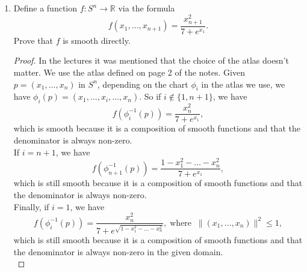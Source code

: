 \documentclass{article}
\begin{document}
\begin{enumerate}[label={\bf Q\arabic*:}]
  \item Define a function $f:S^n\rightarrow\mathbb{R}$ via the formula
    \begin{equation*}
      f(x_1,\ldots,x_{n+1}) = \frac{x_{n+1}^2}{7+e^{x_1}}.
    \end{equation*}
    Prove that $f$ is smooth directly.

    \begin{proof}
      In the lectures it was mentioned that the choice of the atlas doesn't
      matter. We use the atlas defined on page 2 of the notes. Given
      $p=(x_1,\ldots,x_n)$ in $S^n$, depending on the chart $\phi_i$ in the
      atlas we use, we have $\phi_i(p)=(x_1,\ldots,\hat{x_i},\ldots,x_n)$.
      So if $i\not\in\{1,n+1\}$, we have
      \begin{equation*}
        f(\phi_i^{-1}(p)) = \frac{x_{n}^2}{7+e^{x_1}},
      \end{equation*}
      which is smooth because it is a composition of smooth functions and
      that the denominator is always non-zero. \\

      If $i=n+1$, we have
      \begin{equation*}
        f(\phi_{n+1}^{-1}(p)) = \frac{1-x_1^2-\ldots-x_n^2}{7+e^{x_1}},
      \end{equation*}
      which is still smooth because it is a composition of smooth functions
      and that the denominator is always non-zero. \\

      Finally, if $i=1$, we have
      \begin{equation*}
        f(\phi_i^{-1}(p)) =
        \frac{x_{n}^2}{7+e^{\sqrt{1-x_1^2-\ldots-x_n^2}}},\;
        \text{where}\;\; \|(x_1,\ldots,x_n)\|^2\leq1,
      \end{equation*}
      which is still smooth because it is a composition of smooth functions
      and that the denominator is always non-zero in the given domain. \\
    \end{proof}
\end{enumerate}
\end{document}
